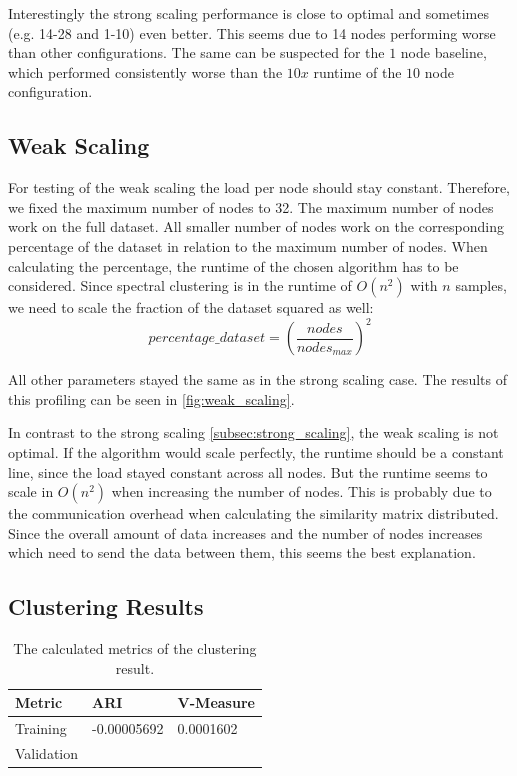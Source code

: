 Interestingly the strong scaling performance is close to optimal and sometimes (e.g. 14-28 and 1-10) even better.
This seems due to 14 nodes performing worse than other configurations.
The same can be suspected for the \(1\) node baseline, which performed consistently worse than the \(10x\) runtime of the \(10\) node configuration.

\subsection{Weak Scaling}
\label{subsec:weak_scaling}

For testing of the weak scaling the load per node should stay constant. Therefore, we fixed the
maximum number of nodes to 32.
The maximum number of nodes work on the full dataset. All smaller number of nodes work on the corresponding
percentage of the dataset in relation to the maximum number of nodes. When calculating the percentage, the runtime
of the chosen algorithm has to be considered. Since spectral clustering is in the runtime of \(O(n^2)\) with \(n\) samples,
we need to scale the fraction of the dataset squared as well:
\[percentage\_dataset = \left(\frac{nodes}{nodes_{max}}\right)^2\]

All other parameters stayed the same as in the strong scaling case.
The results of this profiling can be seen in \cref{fig:weak_scaling}.

In contrast to the strong scaling \cref{subsec:strong_scaling}, the weak scaling is not optimal. If the algorithm would scale perfectly, the runtime should be a
constant line, since the load stayed constant across all nodes. But the runtime seems to scale in \(O(n^2)\) when increasing the number of nodes.
This is probably due to the communication overhead when calculating the similarity matrix distributed.
Since the overall amount of data increases and the number of nodes increases which need to send the data between them, this seems the best explanation.

\subsection{Clustering Results}
\label{subsec:clustering_results}

\begin{table}
    \centering
    \begin{tabular}{lll}
      \toprule
      Metric     &  ARI & V-Measure \\
      \midrule
      Training   &  -0.00005692  &  0.0001602     \\
      Validation &   & \\
      \bottomrule
    \end{tabular}
    \caption{The calculated metrics of the clustering result.}
    \label{tab:clustering_results}
  \end{table}

